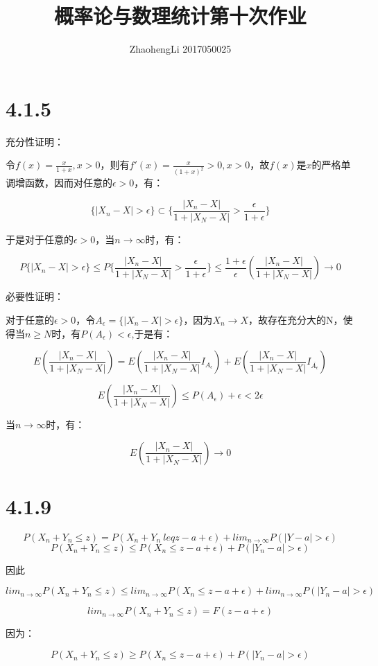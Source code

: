\documentclass{article}
\title{概率论与数理统计第十次作业}
\author{ZhaohengLi 2017050025}
\begin{document}
\maketitle

\section{4.1.5}

充分性证明：

令$f(x)=\frac{x}{1+x}, x>0$，则有$f'(x)=\frac{x}{(1+x)^2}>0, x>0$，故$f(x)$是$x$的严格单调增函数，因而对任意的$\epsilon>0$，有：

$$\{|X_n-X|>\epsilon\} \subset \{\frac{|X_n-X|}{1+|X_N-X|}>\frac{\epsilon}{1+\epsilon}\}$$

于是对于任意的$\epsilon > 0$，当$n \rightarrow \infty$时，有：

$$P\{|X_n-X|>\epsilon\} \leq P\{\frac{|X_n-X|}{1+|X_N-X|}>\frac{\epsilon}{1+\epsilon}\} \leq \frac{1+\epsilon}{\epsilon}(\frac{|X_n-X|}{1+|X_N-X|})\rightarrow 0$$

必要性证明：

对于任意的$\epsilon >0$，令$A_{\epsilon}=\{|X_n-X|>\epsilon\}$，因为$X_n\rightarrow X$，故存在充分大的N，使得当$n\geq N$时，有$P(A_{\epsilon})<\epsilon$,于是有：

$$E(\frac{|X_n-X|}{1+|X_N-X|})=E(\frac{|X_n-X|}{1+|X_N-X|}I_{A_{\epsilon}})+E(\frac{|X_n-X|}{1+|X_N-X|}I_{\overline{A_{\epsilon}}})$$

$$E(\frac{|X_n-X|}{1+|X_N-X|})\leq P(A_\epsilon)+\epsilon<2\epsilon$$

当$n\rightarrow \infty$时，有：

$$E(\frac{|X_n-X|}{1+|X_N-X|})\rightarrow 0$$


\section{4.1.9}
$$P(X_n+Y_n\leq z)=P(X_n+Y_n \ leq z-a+\epsilon)+lim_{n\rightarrow \infty}P(|Y-a|>\epsilon)$$
$$P(X_n+Y_n\leq z)\leq P(X_n\leq z-a+\epsilon)+P(|Y_n-a|>\epsilon)$$

因此

$$lim_{n\rightarrow \infty}P(X_n+Y_n\leq z)\leq lim_{n\rightarrow \infty}P(X_n\leq z-a+\epsilon)+lim_{n\rightarrow \infty}P(|Y_n-a|>\epsilon)$$

$$lim_{n\rightarrow \infty}P(X_n+Y_n\leq z)=F(z-a+\epsilon)$$

因为：

$$P(X_n+Y_n\leq z) \geq P(X_n\leq z-a+\epsilon)+P(|Y_n-a|>\epsilon)$$
\end{document}
